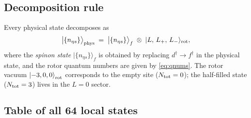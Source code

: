 \documentclass[11pt,a4paper]{article}
\newcommand{\ket}[1]{\left|#1\right\rangle}
\begin{document}
\subsection*{Decomposition rule}

Every physical state decomposes as
\begin{equation}
  \bigl|\{n_{\eta s}\}\bigr\rangle_{\rm phys}
  \;=\;
  \bigl|\{n_{\eta s}\}\bigr\rangle_f
  \;\otimes\;
  |L,\,L_+,\,L_-\rangle_{\rm rot},
\end{equation}
where the \emph{spinon state} $|\{n_{\eta s}\}\rangle_f$ is obtained by
replacing $d^{\dagger}\to f^{\dagger}$ in the physical state, and the rotor
quantum numbers are given by \eqref{eq:qnums}.
The rotor vacuum $\ket{-3,0,0}_{\rm rot}$ corresponds to the empty site
($N_{\rm tot}=0$); the half-filled state ($N_{\rm tot}=3$) lives in the
$L=0$ sector.

\subsection*{Table of all 64 local states}
\end{document}
